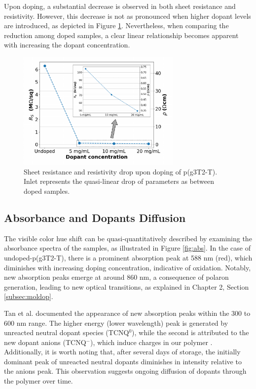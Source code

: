 Upon doping, a substantial decrease is observed in both sheet resistance and resistivity. However, this decrease is not as pronounced when higher dopant levels are introduced, as depicted in Figure \ref{fig:rho}. Nevertheless, when comparing the reduction among doped samples, a clear linear relationship becomes apparent with increasing the dopant concentration. 

\begin{figure}[ht]
  \centering
  \includegraphics[width=8cm]{Images/pdf/resist+inlet.pdf}
  \caption[Sheet resistance and resistivity drop upon doping]{Sheet resistance and resistivity drop upon doping of p(g3T2-T). Inlet represents the quasi-linear drop of parameters as between doped samples.}
  \label{fig:rho}
\end{figure}

\subsection{Absorbance and Dopants Diffusion}
The visible color hue shift can be quasi-quantitatively described by examining the absorbance spectra of the samples, as illustrated in Figure \ref{fig:abs}. In the case of undoped-p(g3T2-T), there is a prominent absorption peak at 588 nm (red), which diminishes with increasing doping concentration, indicative of oxidation. Notably, new absorption peaks emerge at around 860 nm, a consequence of polaron generation, leading to new optical transitions, as explained in Chapter 2, Section \ref{subsec:moldop}. 

Tan et al. documented the appearance of new absorption peaks within the 300 to 600 nm range. The higher energy (lower wavelength) peak is generated by unreacted neutral dopant species (TCNQ$^{0}$), while the second is attributed to the new dopant anions (TCNQ$^{-}$), which induce charges in our polymer \cite{tanTuningOrganicElectrochemical2022}. Additionally, it is worth noting that, after several days of storage, the initially dominant peak of unreacted neutral dopants diminishes in intensity relative to the anions peak. This observation suggests ongoing diffusion of dopants through the polymer over time. 

